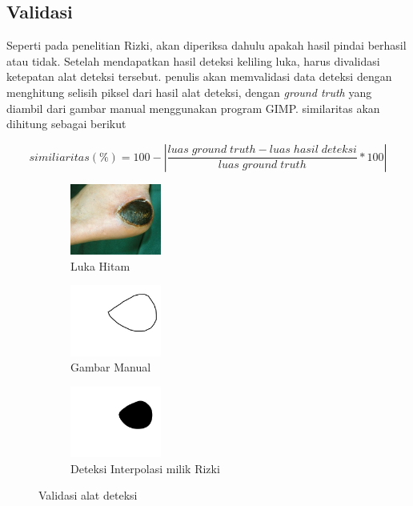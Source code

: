 \subsection{Validasi}

Seperti pada penelitian Rizki, akan diperiksa dahulu apakah hasil
pindai berhasil atau tidak. Setelah mendapatkan 
hasil deteksi keliling luka, harus divalidasi
ketepatan alat deteksi tersebut. penulis akan memvalidasi
data deteksi dengan menghitung selisih piksel dari hasil
alat deteksi, dengan \textit{ground truth} yang diambil dari
gambar manual menggunakan program GIMP.
similaritas akan dihitung sebagai berikut

\begin{equation}
  similiaritas(\%) = 100 - \left| \frac{luas \; ground \; truth - luas \; hasil \; deteksi}
  {luas \; ground \; truth} * 100  \right|
  \label{rumus:groundtruth}
\end{equation}

\begin{figure}[H]
	\centering
	\begin{subfigure}{.3\textwidth}
		\centering
		\includegraphics[keepaspectratio, width=3cm]{gambar/Bab3Extra/LukaHitam.jpg}
		\caption{Luka Hitam}
	\end{subfigure}
	\begin{subfigure}{.3\textwidth}
		\centering
		\includegraphics[keepaspectratio, width=3cm]{gambar/Bab3Extra/LukaHitamManual.jpg}
		\caption{Gambar Manual}
	\end{subfigure} 
	\begin{subfigure}{.3\textwidth}
		\centering
		\includegraphics[keepaspectratio, width=3cm]{gambar/Bab3Extra/LukaHitamInt.jpg}
		\caption{Deteksi Interpolasi milik Rizki}
	\end{subfigure}
	\caption{Validasi alat deteksi}
\end{figure}

